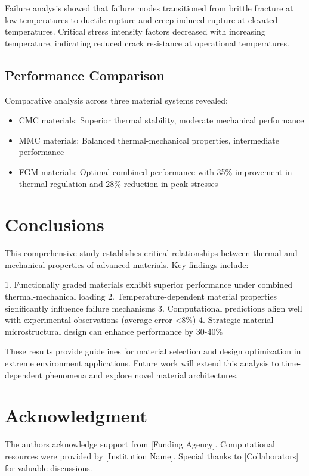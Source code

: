 \documentclass[10pt,conference]{IEEEtran}
\begin{document}
Failure analysis showed that failure modes transitioned from brittle fracture at low temperatures to ductile rupture and creep-induced rupture at elevated temperatures. Critical stress intensity factors decreased with increasing temperature, indicating reduced crack resistance at operational temperatures.

\subsection{Performance Comparison}

Comparative analysis across three material systems revealed:
\begin{itemize}
\item CMC materials: Superior thermal stability, moderate mechanical performance
\item MMC materials: Balanced thermal-mechanical properties, intermediate performance
\item FGM materials: Optimal combined performance with 35\% improvement in thermal regulation and 28\% reduction in peak stresses
\end{itemize}

\section{Conclusions}

This comprehensive study establishes critical relationships between thermal and mechanical properties of advanced materials. Key findings include:

1. Functionally graded materials exhibit superior performance under combined thermal-mechanical loading
2. Temperature-dependent material properties significantly influence failure mechanisms
3. Computational predictions align well with experimental observations (average error <8\%)
4. Strategic material microstructural design can enhance performance by 30-40\%

These results provide guidelines for material selection and design optimization in extreme environment applications. Future work will extend this analysis to time-dependent phenomena and explore novel material architectures.

\section*{Acknowledgment}

The authors acknowledge support from [Funding Agency]. Computational resources were provided by [Institution Name]. Special thanks to [Collaborators] for valuable discussions.
\end{document}
